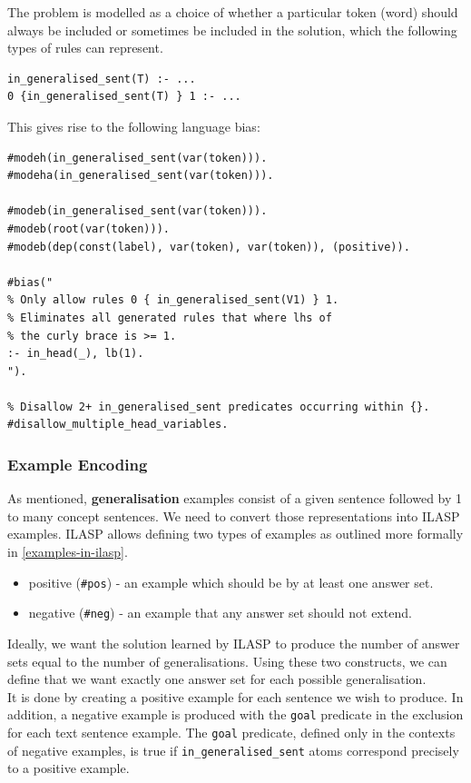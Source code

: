 The problem is modelled as a choice of whether a particular token (word) should always be included or sometimes be included in the solution, which the following types of rules can represent.
\begin{verbatim}
in_generalised_sent(T) :- ...
0 {in_generalised_sent(T) } 1 :- ...
\end{verbatim}

This gives rise to the following language bias:
\begin{verbatim}
#modeh(in_generalised_sent(var(token))).
#modeha(in_generalised_sent(var(token))).

#modeb(in_generalised_sent(var(token))).
#modeb(root(var(token))).
#modeb(dep(const(label), var(token), var(token)), (positive)).

#bias("
% Only allow rules 0 { in_generalised_sent(V1) } 1.
% Eliminates all generated rules that where lhs of 
% the curly brace is >= 1.
:- in_head(_), lb(1).
").

% Disallow 2+ in_generalised_sent predicates occurring within {}.
#disallow_multiple_head_variables.

\end{verbatim}

\subsubsection{Example Encoding}
\label{example-encoding}

As mentioned, \textbf{generalisation} examples consist of a given sentence followed by 1 to many concept sentences.
We need to convert those representations into ILASP examples.
ILASP allows defining two types of examples as outlined more formally in \ref{examples-in-ilasp}.
\begin{itemize}
    \item positive (\verb_#pos_) - an example which should be by at least one answer set.
    \item negative (\verb_#neg_) - an example that any answer set should not extend.
\end{itemize}

Ideally, we want the solution learned by ILASP to produce the number of answer sets equal to the number of generalisations.
Using these two constructs, we can define that we want exactly one answer set for each possible generalisation. \\
It is done by creating a positive example for each sentence we wish to produce. 
In addition, a negative example is produced with the \verb_goal_ predicate in the exclusion for each text sentence example.
The \verb_goal_ predicate, defined only in the contexts of negative examples, is true if \verb+in_generalised_sent+ atoms correspond precisely to a positive example.


